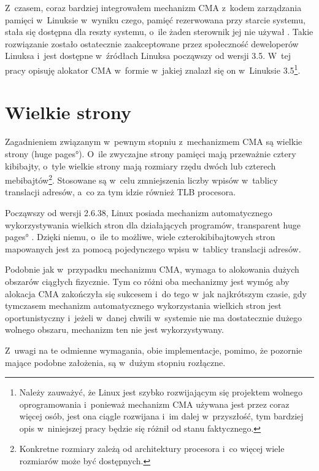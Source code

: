 Z~czasem, coraz bardziej integrowałem mechanizm CMA z~kodem
zarządzania pamięci w~Linuksie w~wyniku czego, pamięć rezerwowana przy
starcie systemu, stała się dostępna dla reszty systemu, o~ile żaden
sterownik jej nie używał \autocite{patch:cma-24}.  Takie rozwiązanie
zostało ostatecznie zaakceptowane przez społeczność deweloperów
Linuksa i~jest dostępne w~źródłach Linuksa począwszy od wersji 3.5.
W~tej pracy opisuję alokator CMA w~formie w~jakiej znalazł się on
w~Linuksie 3.5\footnote{Należy zauważyć, że Linux jest szybko
  rozwijającym się projektem wolnego oprogramowania i~ponieważ
  mechanizm CMA używana jest przez coraz więcej osób, jest ona ciągle
  rozwijana i~im dalej w~przyszłość, tym bardziej opis w~niniejszej
  pracy będzie się różnił od stanu faktycznego.}.

\section{Wielkie strony}

Zagadnieniem związanym w~pewnym stopniu z~mechanizmem CMA są wielkie
strony (\ang{huge pages}).  O~ile zwyczajne strony pamięci mają
przeważnie cztery kibibajty, o~tyle wielkie strony mają rozmiary rzędu
dwóch lub czterech mebibajtów\footnote{Konkretne rozmiary zależą od
  architektury procesora i~co więcej wiele rozmiarów może być
  dostępnych.}.  Stosowane są w~celu zmniejszenia liczby wpisów
w~tablicy translacji adresów, a~co za tym idzie również TLB procesora.

Począwszy od wersji 2.6.38, Linux posiada mechanizm automatycznego
wykorzystywania wielkich stron dla działających programów,
\ang{transparent huge pages} \autocite{bib:v2.6.38}.  Dzięki niemu,
o~ile to możliwe, wiele czterokibibajtowych stron mapowanych jest za
pomocą pojedynczego wpisu w~tablicy translacji adresów.

Podobnie jak w~przypadku mechanizmu CMA, wymaga to alokowania dużych
obszarów ciągłych fizycznie.  Tym co różni oba mechanizmy jest wymóg
aby alokacja CMA zakończyła się sukcesem i~do tego w~jak najkrótszym
czasie, gdy tymczasem mechanizm automatycznego wykorzystania wielkich
stron jest oportunistyczny i~jeżeli w~danej chwili w~systemie nie ma
dostatecznie dużego wolnego obszaru, mechanizm ten nie jest
wykorzystywany.

Z~uwagi na te odmienne wymagania, obie implementacje, pomimo, że
pozornie mające podobne założenia, są w~dużym stopniu rozłączne.
